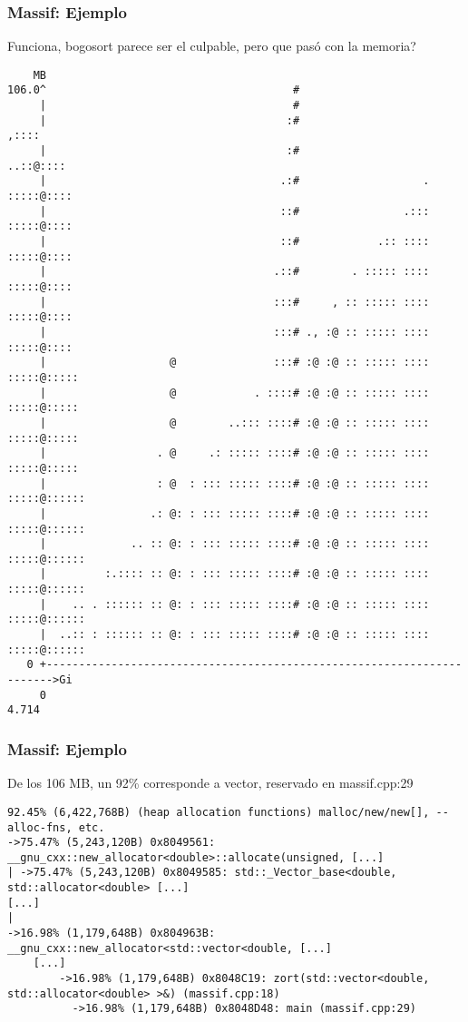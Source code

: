 \documentclass{beamer}
\begin{document}
\begin{frame}[fragile, shrink=45]
\frametitle{Massif: Ejemplo}
  Funciona, bogosort parece ser el culpable, pero \textquestiondown que pas\'o con la memoria?
\begin{verbatim}
    MB
106.0^                                      #                                 
     |                                      #                                 
     |                                     :#                          ,::::  
     |                                     :#                      ..::@::::  
     |                                    .:#                   . :::::@::::  
     |                                    ::#                .::: :::::@::::  
     |                                    ::#            .:: :::: :::::@::::  
     |                                   .::#        . ::::: :::: :::::@::::  
     |                                   :::#     , :: ::::: :::: :::::@::::  
     |                                   :::# ., :@ :: ::::: :::: :::::@::::  
     |                   @               :::# :@ :@ :: ::::: :::: :::::@::::: 
     |                   @            . ::::# :@ :@ :: ::::: :::: :::::@::::: 
     |                   @        ..::: ::::# :@ :@ :: ::::: :::: :::::@::::: 
     |                 . @     .: ::::: ::::# :@ :@ :: ::::: :::: :::::@::::: 
     |                 : @  : ::: ::::: ::::# :@ :@ :: ::::: :::: :::::@::::::
     |                .: @: : ::: ::::: ::::# :@ :@ :: ::::: :::: :::::@::::::
     |             .. :: @: : ::: ::::: ::::# :@ :@ :: ::::: :::: :::::@::::::
     |         :.:::: :: @: : ::: ::::: ::::# :@ :@ :: ::::: :::: :::::@::::::
     |    .. . :::::: :: @: : ::: ::::: ::::# :@ :@ :: ::::: :::: :::::@::::::
     |  ..:: : :::::: :: @: : ::: ::::: ::::# :@ :@ :: ::::: :::: :::::@::::::
   0 +----------------------------------------------------------------------->Gi
     0                                                                   4.714
\end{verbatim}
\end{frame}

\begin{frame}[fragile, shrink=45]
\frametitle{Massif: Ejemplo}
De los 106 MB, un 92\% corresponde a vector, reservado en \alert{massif.cpp:29}
\begin{verbatim}
92.45% (6,422,768B) (heap allocation functions) malloc/new/new[], --alloc-fns, etc.
->75.47% (5,243,120B) 0x8049561: __gnu_cxx::new_allocator<double>::allocate(unsigned, [...]
| ->75.47% (5,243,120B) 0x8049585: std::_Vector_base<double, std::allocator<double> [...]
[...]
|     
->16.98% (1,179,648B) 0x804963B: __gnu_cxx::new_allocator<std::vector<double, [...]
    [...]
        ->16.98% (1,179,648B) 0x8048C19: zort(std::vector<double, std::allocator<double> >&) (massif.cpp:18)
          ->16.98% (1,179,648B) 0x8048D48: main (massif.cpp:29)
\end{verbatim}
\end{frame}
\end{document}
